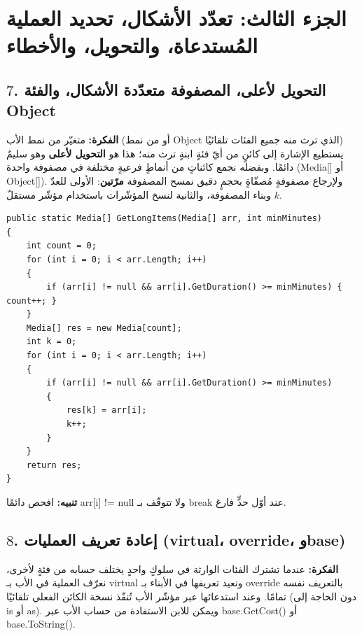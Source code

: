 \documentclass[14pt]{extarticle}
\begin{document}
\clearpage
\section*{الجزء الثالث: تعدّد الأشكال، تحديد العملية المُستدعاة، والتحويل، والأخطاء}

\subsection*{$7$. التحويل لأعلى، المصفوفة متعدّدة الأشكال، والفئة \textenglish{Object}}
\textbf{الفكرة:} متغيّر من نمط الأب (أو من نمط \textenglish{Object} الذي ترث منه جميع الفئات تلقائيًا) يستطيع الإشارة إلى كائنٍ من أيّ فئةٍ ابنةٍ ترث منه؛ هذا هو \textbf{التحويل لأعلى} وهو سليمٌ دائمًا. وبفضله نجمع كائناتٍ من أنماطٍ فرعيةٍ مختلفة في مصفوفة واحدة (\textenglish{Media[]} أو \textenglish{Object[]}). ولإرجاع مصفوفةٍ مُصفّاةٍ بحجمٍ دقيق نمسح المصفوفة \textbf{مرّتين}: الأولى للعدّ وبناء المصفوفة، والثانية لنسخ المؤشّرات باستخدام مؤشّر مستقلّ $k$.

\begin{boxCode}
\begin{english}
\begin{verbatim}
public static Media[] GetLongItems(Media[] arr, int minMinutes)
{
    int count = 0;
    for (int i = 0; i < arr.Length; i++)
    {
        if (arr[i] != null && arr[i].GetDuration() >= minMinutes) { count++; }
    }
    Media[] res = new Media[count];
    int k = 0;
    for (int i = 0; i < arr.Length; i++)
    {
        if (arr[i] != null && arr[i].GetDuration() >= minMinutes)
        {
            res[k] = arr[i];
            k++;
        }
    }
    return res;
}
\end{verbatim}
\end{english}
\end{boxCode}

\textbf{تنبيه:} افحص دائمًا \textenglish{arr[i] != null} ولا تتوقّف بـ \textenglish{break} عند أوّل حدٍّ فارغ.

\filbreak
\subsection*{$8$. إعادة تعريف العمليات (\textenglish{virtual}، \textenglish{override}، و\textenglish{base})}
\textbf{الفكرة:} عندما تشترك الفئات الوارثة في سلوكٍ واحدٍ يختلف حسابه من فئةٍ لأخرى، نعرّف العملية في الأب بـ \textenglish{virtual} ونعيد تعريفها في الأبناء بـ \textenglish{override} بالتعريف نفسه تمامًا. وعند استدعائها عبر مؤشّر الأب تُنفّذ نسخة الكائن الفعلي تلقائيًا (دون الحاجة إلى \textenglish{is} أو \textenglish{as}). ويمكن للابن الاستفادة من حساب الأب عبر \textenglish{base.GetCost()} أو \textenglish{base.ToString()}.
\end{document}

